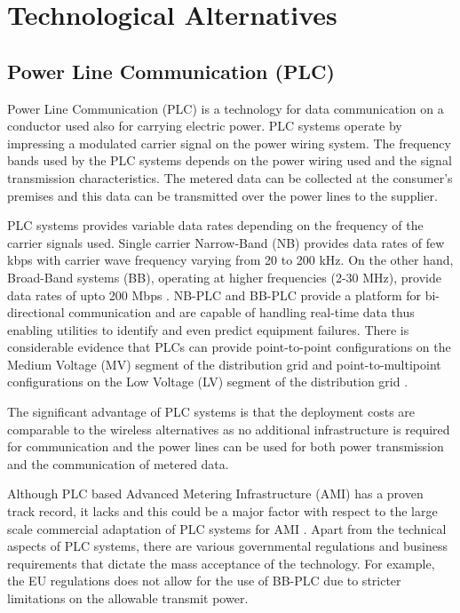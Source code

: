 \chapter{Technological Alternatives}
\section{Power Line Communication (PLC)}

Power Line Communication (PLC) is a technology for data communication on a conductor used also for carrying electric power. PLC systems operate by impressing a modulated carrier signal on the power wiring system. The frequency bands used by the PLC systems depends on the power wiring used and the signal transmission characteristics. The metered data can be collected at the consumer's premises and this data can be transmitted over the power lines to the supplier.

PLC systems provides variable data rates depending on the frequency of the carrier signals used. Single carrier Narrow-Band (NB) provides data rates of few kbps with carrier wave frequency varying from 20 to 200 kHz. On the other hand, Broad-Band systems (BB), operating at higher frequencies (2-30 MHz),  provide data rates of upto 200 Mbps \cite{PLC_galli}. NB-PLC and BB-PLC provide a platform for bi-directional communication and are capable of handling real-time data thus enabling utilities to identify and even predict equipment failures. There is considerable evidence that PLCs can provide point-to-point configurations on the Medium Voltage (MV) segment of the distribution grid and point-to-multipoint configurations on the Low Voltage (LV) segment of the distribution grid \cite{PLC_galli}. 

The significant advantage of PLC systems is that the deployment costs are comparable to the wireless alternatives as no additional infrastructure is required for communication and the power lines can be used for both power transmission and the communication of metered data.

 Although PLC based Advanced Metering Infrastructure (AMI) has a proven track record, it lacks   and this could be a major factor with respect to the large scale commercial adaptation of PLC systems for AMI \cite{PLC_galli}. Apart from the technical aspects of PLC systems, there are various governmental regulations and business requirements that dictate the mass acceptance of the technology. For example, the EU regulations does not allow for the use of BB-PLC due to stricter limitations on the allowable transmit power. 

